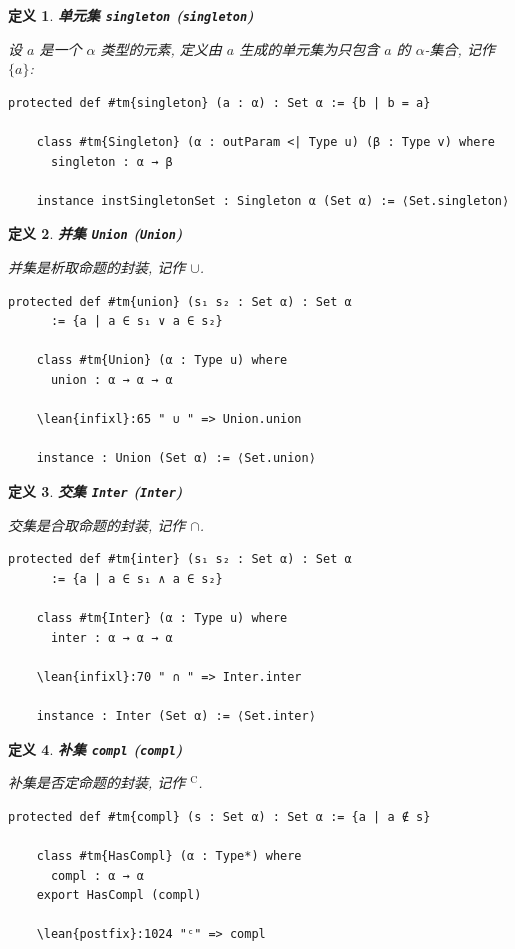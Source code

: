 \documentclass[UTF8]{ctexart}
\DeclareMathOperator{\0}{\mathbf{0}}                    %
\newcommand{\<}{\langle}
\renewcommand{\>}{\rangle}                              %
\newenvironment{dfn_box}{
    \begin{tcolorbox}[enhanced, colback=dfn_green2, boxrule=0pt, frame hidden,
        borderline west={0.7mm}{0.1mm}{dfn_green1},breakable]
    }
    {\end{tcolorbox}}
\theoremstyle{MyStyle} %
\newtheorem{definition}{定义}[subsection]
\newenvironment{dfn}[2]
{
    \begin{dfn_box}
        \begin{definition}
            \textbf{#1
                \ifx\relax#2\relax\else %
                    (#2) %
                \fi}
            \newline
}
{
        \end{definition}
    \end{dfn_box}
}
\newcommand*{\lean}[1]{\texttt{\color{blue}#1}}
\begin{document}
        
        \begin{dfn}
            {单元集}
            {\texttt{singleton}}
            设 $a$ 是一个 $\alpha$ 类型的元素, 定义由 $a$ 生成的单元集为只包含 $a$ 的 $\alpha$-集合, 记作 $\{a\}$:
            \begin{lstlisting}[style=lean]
    protected def #tm{singleton} (a : α) : Set α := {b | b = a}

    class #tm{Singleton} (α : outParam <| Type u) (β : Type v) where
      singleton : α → β
    
    instance instSingletonSet : Singleton α (Set α) := ⟨Set.singleton⟩
            \end{lstlisting}
        \end{dfn}
    
        
        \begin{dfn}
            {并集}
            {\texttt{Union}}
            并集是析取命题的封装, 记作 $\cup$. 
            \begin{lstlisting}[style=lean]
    protected def #tm{union} (s₁ s₂ : Set α) : Set α
      := {a | a ∈ s₁ ∨ a ∈ s₂}

    class #tm{Union} (α : Type u) where
      union : α → α → α

    \lean{infixl}:65 " ∪ " => Union.union
    
    instance : Union (Set α) := ⟨Set.union⟩
            \end{lstlisting}
        \end{dfn}

        
        \begin{dfn}
            {交集}
            {\texttt{Inter}}
            交集是合取命题的封装, 记作 $\cap$. 
            \begin{lstlisting}[style=lean]
    protected def #tm{inter} (s₁ s₂ : Set α) : Set α
      := {a | a ∈ s₁ ∧ a ∈ s₂}
    
    class #tm{Inter} (α : Type u) where
      inter : α → α → α
    
    \lean{infixl}:70 " ∩ " => Inter.inter
    
    instance : Inter (Set α) := ⟨Set.inter⟩
            \end{lstlisting}
        \end{dfn}

        \begin{dfn}
            {补集}
            {\texttt{compl}}
            补集是否定命题的封装, 记作 $^{\mathrm{C}}$.
            \begin{lstlisting}[style=lean]
    protected def #tm{compl} (s : Set α) : Set α := {a | a ∉ s}

    class #tm{HasCompl} (α : Type*) where
      compl : α → α
    export HasCompl (compl)

    \lean{postfix}:1024 "ᶜ" => compl
            \end{lstlisting}
        \end{dfn}
        
\end{document}
